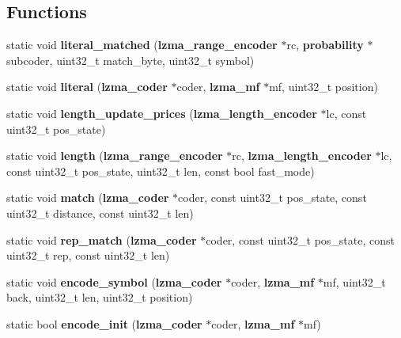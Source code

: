 \subsection*{Functions}
\begin{DoxyCompactItemize}
\item 
static void {\bfseries literal\-\_\-matched} ({\bf lzma\-\_\-range\-\_\-encoder} $\ast$rc, {\bf probability} $\ast$subcoder, uint32\-\_\-t match\-\_\-byte, uint32\-\_\-t symbol)\label{lzma__encoder_8c_a276c6d863c72ad4e56fa1034142fcb85}

\item 
static void {\bfseries literal} ({\bf lzma\-\_\-coder} $\ast$coder, {\bf lzma\-\_\-mf} $\ast$mf, uint32\-\_\-t position)\label{lzma__encoder_8c_ac7b07aedbbdef4cf918d0a0270267105}

\item 
static void {\bfseries length\-\_\-update\-\_\-prices} ({\bf lzma\-\_\-length\-\_\-encoder} $\ast$lc, const uint32\-\_\-t pos\-\_\-state)\label{lzma__encoder_8c_af7b06ec5cf3bb55193e2e3bcc236ee23}

\item 
static void {\bfseries length} ({\bf lzma\-\_\-range\-\_\-encoder} $\ast$rc, {\bf lzma\-\_\-length\-\_\-encoder} $\ast$lc, const uint32\-\_\-t pos\-\_\-state, uint32\-\_\-t len, const bool fast\-\_\-mode)\label{lzma__encoder_8c_a3df350e3a724f22844bcfaca65620695}

\item 
static void {\bfseries match} ({\bf lzma\-\_\-coder} $\ast$coder, const uint32\-\_\-t pos\-\_\-state, const uint32\-\_\-t distance, const uint32\-\_\-t len)\label{lzma__encoder_8c_af8b0bd8be0664f851345d198cc5d887f}

\item 
static void {\bfseries rep\-\_\-match} ({\bf lzma\-\_\-coder} $\ast$coder, const uint32\-\_\-t pos\-\_\-state, const uint32\-\_\-t rep, const uint32\-\_\-t len)\label{lzma__encoder_8c_a6481b2e38e7c89b4fb6d9d725b31bd3c}

\item 
static void {\bfseries encode\-\_\-symbol} ({\bf lzma\-\_\-coder} $\ast$coder, {\bf lzma\-\_\-mf} $\ast$mf, uint32\-\_\-t back, uint32\-\_\-t len, uint32\-\_\-t position)\label{lzma__encoder_8c_a99fb9c71de556f4306586821f25fa371}

\item 
static bool {\bfseries encode\-\_\-init} ({\bf lzma\-\_\-coder} $\ast$coder, {\bf lzma\-\_\-mf} $\ast$mf)\label{lzma__encoder_8c_ab39b61691c6378000fe473bd62f48840}


\end{DoxyCompactItemize}
